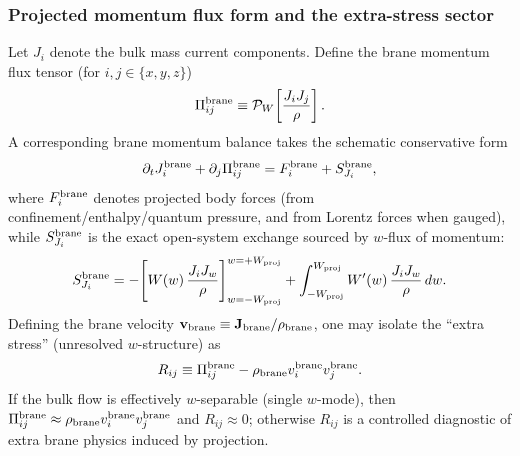 \documentclass[11pt]{article}
\begin{document}
\subsubsection{Projected momentum flux form and the extra-stress sector}
Let $J_i$ denote the bulk mass current components.  Define the brane momentum flux
tensor (for $i,j\in\{x,y,z\}$)
\begin{align}
\Pi_{ij}^{\rm brane} \equiv \mathcal{P}_W\!\left[\frac{J_iJ_j}{\rho}\right].
\label{eq:app_Pi_def}
\end{align}
A corresponding brane momentum balance takes the schematic conservative form
\begin{align}
\partial_t J_i^{\rm brane} + \partial_j \Pi_{ij}^{\rm brane}
= F^{\rm brane}_i + S^{\rm brane}_{J_i},
\label{eq:brane_momentum_balance}
\end{align}
where $F^{\rm brane}_i$ denotes projected body forces (from confinement/enthalpy/quantum
pressure, and from Lorentz forces when gauged), while $S^{\rm brane}_{J_i}$ is the exact
open-system exchange sourced by $w$-flux of momentum:
\begin{align}
S^{\rm brane}_{J_i}
=
-\Bigg[W(w)\,\frac{J_iJ_w}{\rho}\Bigg]_{w=-W_{\rm proj}}^{w=+W_{\rm proj}}
+\int_{-W_{\rm proj}}^{W_{\rm proj}} W'(w)\,\frac{J_iJ_w}{\rho}\,dw.
\label{eq:momentum_exchange}
\end{align}
Defining the brane velocity $\mathbf{v}_{\rm brane}\equiv \mathbf{J}_{\rm brane}/\rho_{\rm brane}$,
one may isolate the ``extra stress'' (unresolved $w$-structure) as
\begin{align}
R_{ij} \equiv \Pi_{ij}^{\rm brane} - \rho_{\rm brane} v^{\rm brane}_i v^{\rm brane}_j.
\label{eq:app_Rij_def}
\end{align}
If the bulk flow is effectively $w$-separable (single $w$-mode), then $\Pi_{ij}^{\rm brane}\approx
\rho_{\rm brane} v^{\rm brane}_i v^{\rm brane}_j$ and $R_{ij}\approx 0$; otherwise $R_{ij}$ is a
controlled diagnostic of extra brane physics induced by projection.
\end{document}
